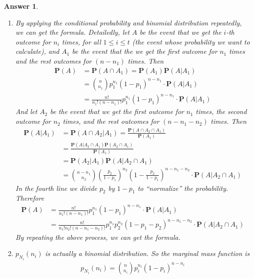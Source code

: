 \documentclass[utf8]{article}
\theoremstyle{definition}%
\theoremstyle{plain}%
\newtheorem{answer}{Answer} %
\begin{document}
\begin{answer} ~
    \begin{enumerate}[label=(\alph*)]
        \item By applying the conditional probability and binomial distribution repeatedly, we can get the formula. Detailedly, let $A$ be the event that we get the $i$-th outcome for $n_i$ times, for all $1 \leq i \leq t$ (the event whose probability we want to calculate), and $A_1$ be the event that the we get the first outcome for $n_1$ times and the rest outcomes for $(n - n_1)$ times. Then
        \begin{equation}
        \begin{aligned}
            \mathbf{P}(A) &= \mathbf{P}(A \cap A_1) = \mathbf{P}(A_1) \mathbf{P}(A | A_1) \\
            &= \binom{n}{n_1} p_1^{n_1} (1-p_1)^{n-n_1} \cdot \mathbf{P}(A | A_1) \\ 
            &= \frac{n!}{n_1!(n-n_1)!} p_1^{n_1} (1-p_1)^{n-n_1} \cdot \mathbf{P}(A | A_1)
        \end{aligned}
        \end{equation}
        And let $A_2$ be the event that we get the first outcome for $n_1$ times, the second outcome for $n_2$ times, and the rest outcomes for $(n - n_1 - n_2)$ times. Then
        \begin{equation}
        \begin{aligned}
            \mathbf{P}(A | A_1) &= \mathbf{P}(A \cap A_2 | A_1) = \frac{\mathbf{P}(A \cap A_2 \cap A_1)}{\mathbf{P}(A_1)} \\ 
            &= \frac{\mathbf{P}(A | A_2 \cap A_1) \mathbf{P}(A_2 \cap A_1)}{\mathbf{P}(A_1)} \\ 
            &= \mathbf{P}(A_2 | A_1) \mathbf{P}(A | A_2 \cap A_1) \\ 
            &= \binom{n-n_1}{n_2} \left(\frac{p_2}{1 - p_1}\right)^{n_2} \left(1 - \frac{p_2}{1 - p_1}\right)^{n-n_1-n_2} \cdot \mathbf{P}(A | A_2 \cap A_1)
        \end{aligned}
        \end{equation}
        In the fourth line we divide $p_2$ by $1 - p_1$ to ``normalize'' the probability. Therefore
        \begin{equation}
        \begin{aligned}
            \mathbf{P}(A) &= \frac{n!}{n_1!(n-n_1)!} p_1^{n_1} (1-p_1)^{n-n_1} \cdot \mathbf{P}(A | A_1) \\ 
            &= \frac{n!}{n_1!n_2!(n-n_1-n_2)!} p_1^{n_1} p_2^{n_2} (1-p_1-p_2)^{n-n_1-n_2} \cdot \mathbf{P}(A | A_2 \cap A_1)
        \end{aligned}
        \end{equation}
        By repeating the above process, we can get the formula. 
        \item $p_{N_i}(n_i)$ is actually a binomial distribution. So the marginal mass function is
        \begin{align}
            p_{N_i}(n_i) = \binom{n}{n_i} p_i^{n_i} (1-p_i)^{n-n_i}
        \end{align}
    \end{enumerate}
    
\end{answer}
\end{document}
